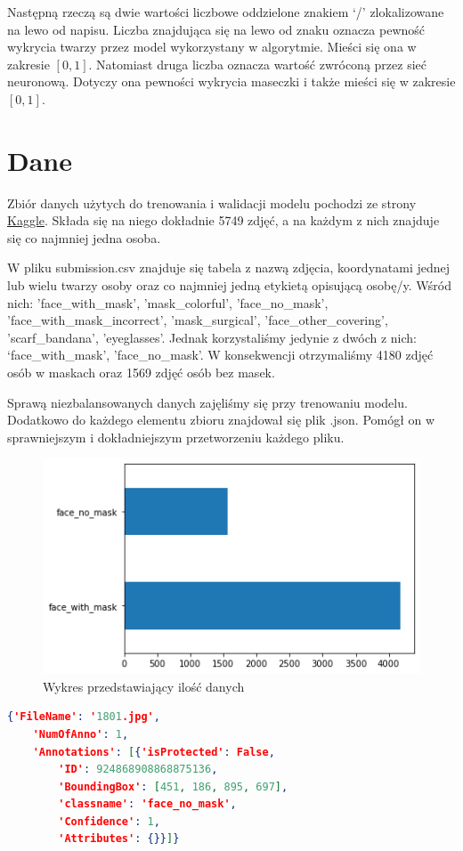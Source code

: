 \documentclass[12pt]{article}
\begin{document}
	Następną rzeczą są dwie wartości liczbowe oddzielone znakiem ‘/’ zlokalizowane na lewo od napisu. Liczba znajdująca się na lewo od znaku oznacza pewność wykrycia twarzy przez model wykorzystany w algorytmie. Mieści się ona w zakresie \([0, 1]\). Natomiast druga liczba oznacza wartość zwróconą przez sieć neuronową. Dotyczy ona pewności wykrycia maseczki i także mieści się w zakresie \([0, 1]\).
	\section{Dane}
	Zbiór danych użytych do trenowania i walidacji modelu pochodzi ze strony \href{https://www.kaggle.com/wobotintelligence/face-mask-detection-dataset}{Kaggle}. Składa się na niego dokładnie 5749 zdjęć, a na każdym z nich znajduje się co najmniej jedna osoba.
	
	W pliku submission.csv znajduje się tabela z nazwą zdjęcia, koordynatami jednej lub wielu twarzy osoby oraz co najmniej jedną etykietą opisującą osobę/y. Wśród nich: 'face\_with\_mask', 'mask\_colorful', 'face\_no\_mask', 'face\_with\_mask\_incorrect', 'mask\_surgical', 'face\_other\_covering', 'scarf\_bandana', 'eyeglasses'. Jednak korzystaliśmy jedynie z dwóch z nich: ‘face\_with\_mask', 'face\_no\_mask'. W konsekwencji otrzymaliśmy 4180 zdjęć osób w maskach oraz 1569 zdjęć osób bez masek.
	
	Sprawą niezbalansowanych danych zajęliśmy się przy trenowaniu modelu.
	Dodatkowo do każdego elementu zbioru znajdował się plik .json. Pomógł on w sprawniejszym i dokładniejszym przetworzeniu każdego pliku.
	\begin{figure}[h]
		\centering
		\includegraphics[width=\textwidth]{dane.png}
		\caption{Wykres przedstawiający ilość danych}
		\label{fig:dane}
	\end{figure}
	\begin{lstlisting}[language=json,caption=Przykład pliku json, captionpos=b]
{'FileName': '1801.jpg',
	'NumOfAnno': 1,
	'Annotations': [{'isProtected': False,
		'ID': 924868908868875136,
		'BoundingBox': [451, 186, 895, 697],
		'classname': 'face_no_mask',
		'Confidence': 1,
		'Attributes': {}}]}
	\end{lstlisting}
\end{document}

